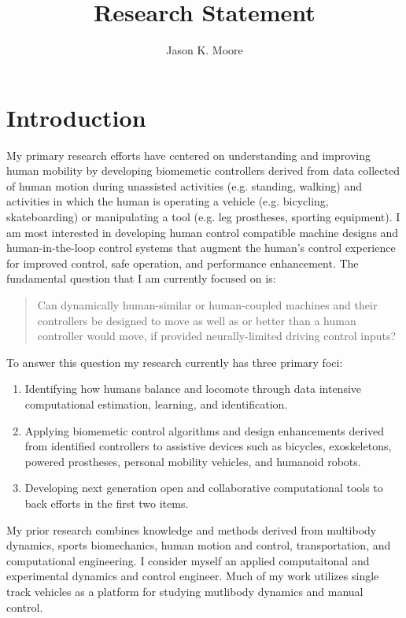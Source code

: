 \documentclass{article}
\title{Research Statement}
\author{Jason K. Moore}
\date{}
\begin{document}
\maketitle

\section*{Introduction}
%
My primary research efforts have centered on understanding and improving human
mobility by developing biomemetic controllers derived from data collected of
human motion during unassisted activities (e.g. standing, walking) and
activities in which the human is operating a vehicle (e.g. bicycling, skateboarding)
or manipulating a tool (e.g. leg prostheses, sporting equipment). I am most
interested in developing human control compatible machine designs and
human-in-the-loop control systems that augment the human's control experience
for improved control, safe operation, and performance enhancement. The
fundamental question that I am currently focused on is:
%
\begin{quote}
 Can dynamically human-similar or human-coupled machines and their controllers
 be designed to move as well as or better than a human controller would move,
 if provided neurally-limited driving control inputs?
\end{quote}

To answer this question my research currently has three primary foci:
%
\begin{enumerate}
  \item Identifying how humans balance and locomote through data intensive
    computational estimation, learning, and identification.
  \item Applying biomemetic control algorithms and design enhancements derived
    from identified controllers to assistive devices such as bicycles,
    exoskeletons, powered prostheses, personal mobility vehicles, and humanoid
    robots.
  \item Developing next generation open and collaborative computational tools
    to back efforts in the first two items.
 \end{enumerate}

My prior research combines knowledge and methods derived from multibody
dynamics, sports biomechanics, human motion and control, transportation, and
computational engineering. I consider myself an applied computaitonal and
experimental dynamics and control engineer. Much of my work utilizes single
track vehicles as a platform for studying mutlibody dynamics and manual
control.
\end{document}
